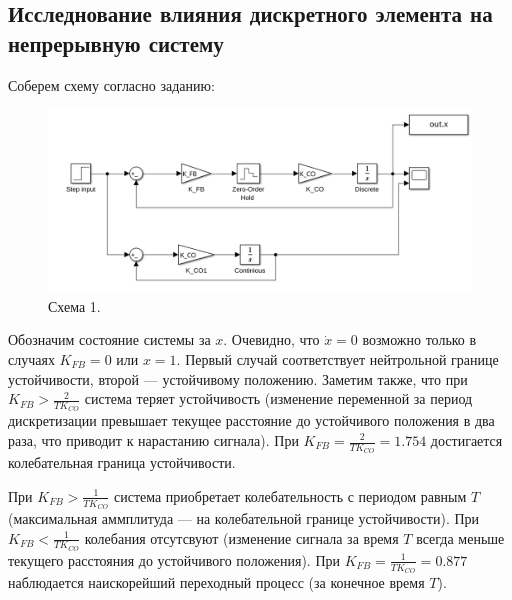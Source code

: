 \documentclass[a4paper, 14pt]{extarticle}
\theoremstyle{definition}
\theoremstyle{plain}
\theoremstyle{remark}
\begin{document}
\subsection{Исследнование влияния дискретного элемента на непрерывную систему}
Соберем схему согласно заданию:
\begin{figure}
    [H]
    \centering
    \includegraphics[width=\textwidth]{images/scheme_1.png}
    \caption{Схема 1.}
    \label{fig:scheme_1}
\end{figure}

Обозначим состояние системы за $x$. Очевидно, что $\dot{x}=0$ возможно только в случаях $K_{FB}=0$ или $x=1$. Первый случай соответствует нейтрольной границе устойчивости, второй --- устойчивому положению. Заметим также, что при $K_{FB}>\frac{2}{TK_{CO}}$ система теряет устойчивость (изменение переменной за период дискретизации превышает текущее расстояние до устойчивого положения в два раза, что приводит к нарастанию сигнала). При $K_{FB}=\frac{2}{TK_{CO}}=1.754$ достигается колебательная граница устойчивости.

При $K_{FB}>\frac{1}{TK_{CO}}$ система приобретает колебательность с периодом равным $T$ (максимальная аммплитуда --- на колебательной границе устойчивости). При $K_{FB}<\frac{1}{TK_{CO}}$ колебания отсутсвуют (изменение сигнала за время $T$ всегда меньше текущего расстояния до устойчивого положения). При $K_{FB}=\frac{1}{TK_{CO}}=0.877$ наблюдается наискорейший переходный процесс (за конечное время $T$).
\end{document}
